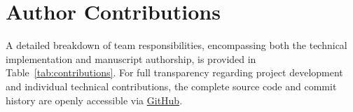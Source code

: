 \documentclass[pmlr]{jmlr}%
\begin{document}



\newpage
\appendix

\section{Author Contributions}
\label{app:contributions}
A detailed breakdown of team responsibilities, encompassing both the technical implementation and manuscript authorship, is provided in Table~\ref{tab:contributions}. For full transparency regarding project development and individual technical contributions, the complete source code and commit history are openly accessible via \href{https://github.com/biswurmt/mlmd-noise/graphs/contributors}{GitHub}.
\end{document}
